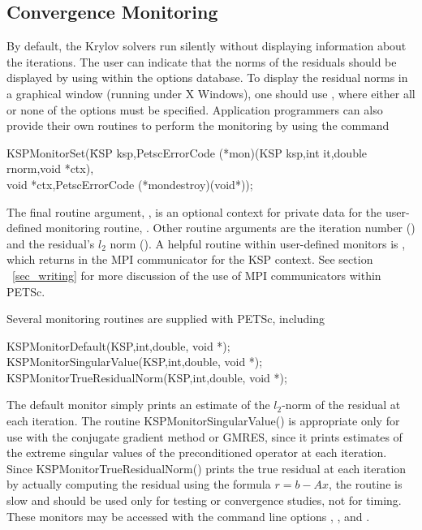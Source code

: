 \subsection{Convergence Monitoring}
\label{sec_kspmonitor}

By default, the Krylov solvers run silently without displaying information 
about the iterations. The user can indicate that the norms of the residuals 
should be displayed by using 
 within the options database.  
To display the residual norms in a graphical window (running under X Windows),
one should use  \trl{[x,y,w,h]}, where either all or none of 
the options must be specified. 
Application programmers can also provide their own routines to perform 
the monitoring by using the command 
\begin{tabbing}
  KSPMonitorSet(\=KSP ksp,PetscErrorCode (*mon)(KSP ksp,int it,double rnorm,void *ctx),\\
                \>        void *ctx,PetscErrorCode (*mondestroy)(void*));
\end{tabbing}
The final routine argument, , is an optional context for private
data for the user-defined monitoring routine, .  Other
 routine arguments are the iteration
number () and the residual's $ l_2 $ norm ().
A helpful routine within user-defined monitors is 
, which returns
in   the
MPI communicator for the KSP context.  See section ~\ref{sec_writing}
for more discussion of the use of MPI communicators within PETSc.

Several monitoring routines are supplied with PETSc, 
including 
\begin{tabbing}
  KSPMonitorDefault(KSP,int,double, void *);\\
  KSPMonitorSingularValue(KSP,int,double, void *);\\
  KSPMonitorTrueResidualNorm(KSP,int,double, void *);
\end{tabbing}
The default monitor simply prints an estimate of the $l_2$-norm of the 
residual at each iteration. The routine
KSPMonitorSingularValue() is appropriate only for use with the conjugate 
gradient method or GMRES, since it prints estimates of the extreme singular 
values of the preconditioned operator at each iteration. Since
KSPMonitorTrueResidualNorm() prints 
the true residual at each iteration by 
actually computing the residual using the formula $ r = b - Ax $, the routine
is slow and should be used only for testing or convergence studies,
not for timing. These monitors may be accessed with the command line options
, , and .
  

